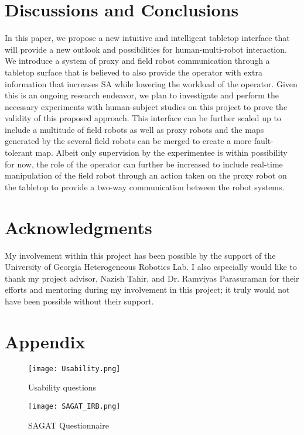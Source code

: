 \documentclass[conference]{IEEEtran}
\begin{document}
\section{Discussions and Conclusions} 
In this paper, we propose a new intuitive and intelligent tabletop interface that will provide a new outlook and possibilities for human-multi-robot interaction. We introduce a system of proxy and field robot communication through a tabletop surface that is believed to also provide the operator with extra information that increases SA while lowering the workload of the operator. Given this is an ongoing research endeavor, we plan to investigate and perform the necessary experiments with human-subject studies on this project to prove the validity of this proposed approach. This interface can be further scaled up to include a multitude of field robots as well as proxy robots and the maps generated by the several field robots can be merged to create a more fault-tolerant map. Albeit only supervision by the experimentee is within possibility for now, the role of the operator can further be increased to include real-time manipulation of the field robot through an action taken on the proxy robot on the tabletop to provide a two-way communication between the robot systems. 
 
\section*{Acknowledgments}

My involvement within this project has been possible by the support of the University of Georgia Heterogeneous Robotics Lab. I also especially would like to thank my project advisor, Nazish Tahir, and Dr. Ramviyas Parasuraman for their efforts and mentoring during my involvement in this project; it truly would not have been possible without their support. 


\newpage
\section{Appendix}

\begin{figure}[h]
\texttt{[image: Usability.png]}
\caption{Usability questions}
\end{figure} 


\begin{figure}[h]
\texttt{[image: SAGAT\_IRB.png]}
\caption{SAGAT Questionnaire}
\end{figure} 
\end{document}
